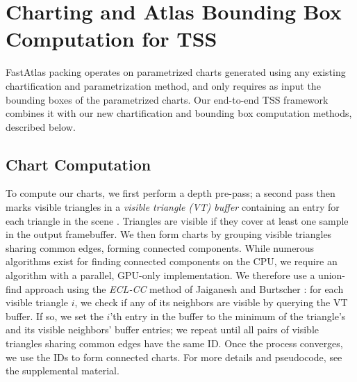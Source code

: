 \section{Charting and Atlas Bounding Box Computation for TSS}
FastAtlas packing operates on parametrized charts generated using any existing chartification and parametrization method, and only requires as input the bounding boxes of the parametrized charts. Our end-to-end TSS framework combines it with our new chartification and bounding box computation methods, described below.

\subsection{Chart Computation}
\label{sec:charts}
\label{sec:visible}

To compute our charts, we first perform a depth pre-pass; a second pass then marks visible triangles in a {\em visible triangle (VT) buffer} containing an entry for each triangle in the scene \cite{burns2013visibility,kubisch2014opengl}. Triangles are visible if they cover at least one sample in the output framebuffer.
We then form charts by grouping visible triangles sharing common edges, forming connected components. While numerous algorithms exist for finding connected components on the CPU, we require an algorithm with a parallel, GPU-only implementation. We therefore use a union-find approach \cite{skiena1998algorithm} using the {\em ECL-CC} method of Jaiganesh and Burtscher : for each visible triangle $i$, we check if any of its neighbors are visible by querying the VT buffer. If so, we set the $i$'th entry in the buffer to the minimum of the triangle's and its visible neighbors' buffer entries; we repeat until all pairs of visible triangles sharing common edges have the same ID. Once the process converges, we use the IDs to form connected charts. For more details and pseudocode, see the supplemental material.
